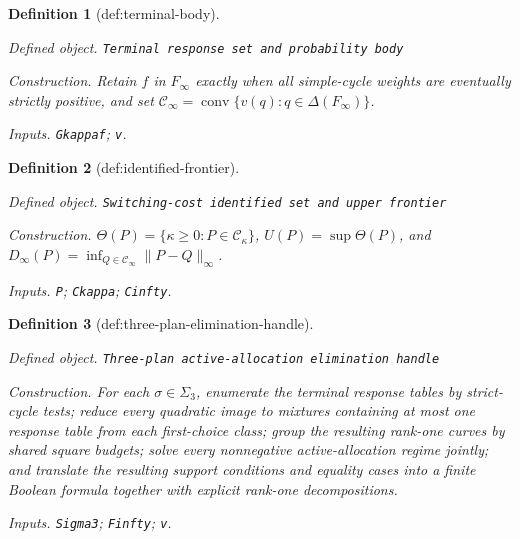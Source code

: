 \documentclass{article}
\newtheorem{definition}{Definition}
\begin{document}
\begin{definition}[def:terminal-body]\label{def:terminal-body}
\par\smallskip\noindent\emph{Defined object.} \texttt{Terminal response set and probability body}
\par\smallskip\noindent\emph{Construction.} Retain \(f\) in \(F_\infty\) exactly when all simple-cycle weights are eventually strictly positive, and set \(\mathcal C_\infty=\operatorname{conv}\{v(q):q\in\Delta(F_\infty)\}\).
\par\smallskip\noindent\emph{Inputs.} \texttt{Gkappaf}; \texttt{v}.
\end{definition}

\begin{definition}[def:identified-frontier]\label{def:identified-frontier}
\par\smallskip\noindent\emph{Defined object.} \texttt{Switching-\allowbreak{}cost identified set and upper frontier}
\par\smallskip\noindent\emph{Construction.} \(\Theta(P)=\{\kappa\ge0:P\in\mathcal C_\kappa\}\), \(U(P)=\sup\Theta(P)\), and \(D_\infty(P)=\inf_{Q\in\mathcal C_\infty}\|P-Q\|_\infty\).
\par\smallskip\noindent\emph{Inputs.} \texttt{P}; \texttt{Ckappa}; \texttt{Cinfty}.
\end{definition}

\begin{definition}[def:three-plan-elimination-handle]\label{def:three-plan-elimination-handle}
\par\smallskip\noindent\emph{Defined object.} \texttt{Three-\allowbreak{}plan active-\allowbreak{}allocation elimination handle}
\par\smallskip\noindent\emph{Construction.} For each \(\sigma\in\Sigma_3\), enumerate the terminal response tables by strict-cycle tests; reduce every quadratic image to mixtures containing at most one response table from each first-choice class; group the resulting rank-one curves by shared square budgets; solve every nonnegative active-allocation regime jointly; and translate the resulting support conditions and equality cases into a finite Boolean formula together with explicit rank-one decompositions.
\par\smallskip\noindent\emph{Inputs.} \texttt{Sigma3}; \texttt{Finfty}; \texttt{v}.
\end{definition}
\end{document}
